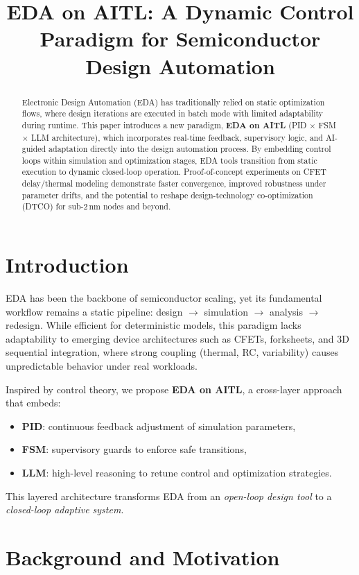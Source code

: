 \documentclass[conference]{IEEEtran}
\title{EDA on AITL: A Dynamic Control Paradigm for Semiconductor Design Automation}
\author{
  \IEEEauthorblockN{Shinichi Samizo}
  \IEEEauthorblockA{Independent Semiconductor Researcher\\
  Email: \href{mailto:shin3t72@gmail.com}{shin3t72@gmail.com}}
}
\begin{document}
\maketitle

\begin{abstract}
Electronic Design Automation (EDA) has traditionally relied on static optimization flows, 
where design iterations are executed in batch mode with limited adaptability during runtime. 
This paper introduces a new paradigm, \textbf{EDA on AITL} 
(PID $\times$ FSM $\times$ LLM architecture), 
which incorporates real-time feedback, supervisory logic, and AI-guided adaptation 
directly into the design automation process. 
By embedding control loops within simulation and optimization stages, 
EDA tools transition from static execution to dynamic closed-loop operation. 
Proof-of-concept experiments on CFET delay/thermal modeling demonstrate 
faster convergence, improved robustness under parameter drifts, 
and the potential to reshape design-technology co-optimization (DTCO) 
for sub-2\,nm nodes and beyond.
\end{abstract}

\section{Introduction}
EDA has been the backbone of semiconductor scaling, 
yet its fundamental workflow remains a static pipeline:
design $\to$ simulation $\to$ analysis $\to$ redesign. 
While efficient for deterministic models, this paradigm lacks adaptability 
to emerging device architectures such as CFETs, forksheets, and 3D sequential integration, 
where strong coupling (thermal, RC, variability) 
causes unpredictable behavior under real workloads.

Inspired by control theory, 
we propose \textbf{EDA on AITL}, a cross-layer approach that embeds:
\begin{itemize}
  \item \textbf{PID}: continuous feedback adjustment of simulation parameters,
  \item \textbf{FSM}: supervisory guards to enforce safe transitions,
  \item \textbf{LLM}: high-level reasoning to retune control and optimization strategies.
\end{itemize}
This layered architecture transforms EDA from an \emph{open-loop design tool} 
to a \emph{closed-loop adaptive system}.

\section{Background and Motivation}
\end{document}
